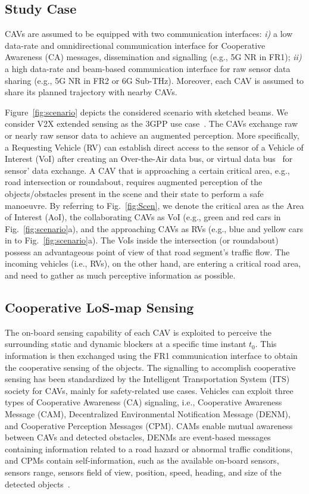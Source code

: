 \documentclass[journal]{IEEEtran}
\begin{document}
\subsection{Study Case}

CAVs are assumed to be equipped with two communication interfaces: \textit{i)} a low data-rate and omnidirectional communication interface for Cooperative Awareness (CA) messages, dissemination and signalling (e.g., 5G NR in FR1); \textit{ii)} a high data-rate and beam-based communication interface for raw sensor data sharing (e.g., 5G NR in FR2 or 6G Sub-THz). Moreover, each CAV is assumed to share its planned trajectory with nearby CAVs.

Figure~\ref{fig:scenario} depicts the considered scenario with sketched beams. We consider V2X extended sensing as the 3GPP use case~\cite{14rel}. The CAVs exchange raw or nearly raw sensor data to achieve an augmented perception. More specifically, a Requesting Vehicle (RV) can establish direct access to the sensor of a Vehicle of Interest (VoI) after creating an Over-the-Air data bus, or virtual data bus~\cite{ChoVaGonDanBhaHea:J16} for sensor' data exchange. A CAV that is approaching a certain critical area, e.g., road intersection or roundabout, requires augmented perception of the objects/obstacles present in the scene and their state to perform a safe manoeuvre. By referring to Fig.~\ref{fig:Scen}, we denote the critical area as the Area of Interest (AoI), the collaborating CAVs as VoI (e.g., green and red cars in Fig.~\ref{fig:scenario}a), and the approaching CAVs as RVs (e.g., blue and yellow cars in to Fig.~\ref{fig:scenario}a). 
The VoIs inside the intersection (or roundabout) possess an advantageous point of view of that road segment's traffic flow. The incoming vehicles (i.e., RVs), on the other hand, are entering a critical road area, and need to gather as much perceptive information as possible.

\subsection{Cooperative LoS-map Sensing} \label{sec:sens}

The on-board sensing capability of each CAV is exploited to perceive the surrounding static and dynamic blockers at a specific time instant $t_0$. This information is then exchanged using the FR1 communication interface to obtain the cooperative sensing of the objects. 
The signalling to accomplish cooperative sensing has been standardized by the Intelligent Transportation System (ITS) society for CAVs, mainly for safety-related use cases. Vehicles can exploit three types of Cooperative Awareness (CA) signaling, i.e., Cooperative Awareness Message (CAM), Decentralized Environmental Notification Message (DENM), and Cooperative Perception Messages (CPM). CAMs enable mutual awareness between CAVs and detected obstacles, DENMs are event-based messages containing information related to a road hazard or abnormal traffic conditions, and CPMs contain self-information, such as the available on-board sensors, sensors range, sensors field of view, position, speed, heading, and size of the detected objects~\cite{CAMstandard}. 
\end{document}
